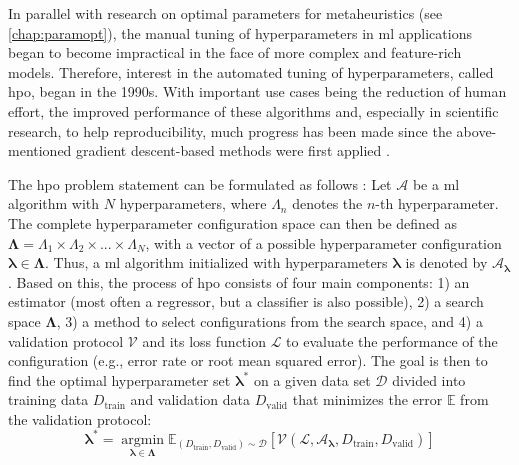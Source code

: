 In parallel with research on optimal parameters for metaheuristics (see \ref{chap:paramopt}), the manual tuning of hyperparameters in \gls{ml} applications began to become impractical in the face of more complex and feature-rich models. Therefore, interest in the automated tuning of hyperparameters, called \gls{hpo}, began in the 1990s. With important use cases being the reduction of human effort, the improved performance of these algorithms and, especially in scientific research, to help reproducibility, much progress has been made since the above-mentioned gradient descent-based methods were first applied  \cite{feurer2019hyperparameter}. 

The \gls{hpo} problem statement can be formulated as follows \cite{feurer2019hyperparameter}:
Let $\mathcal{A}$ be a \gls{ml} algorithm with $N$ hyperparameters, where $\Lambda_n$ denotes the $n$-th hyperparameter. The complete hyperparameter configuration space can then be defined as $\mathbf{\Lambda} = \Lambda_1 \times \Lambda_2 \times ... \times \Lambda_N$, with a vector of a possible hyperparameter configuration $\mathbf{\lambda} \in \mathbf{\Lambda}$. Thus, a \gls{ml} algorithm initialized with hyperparameters $\mathbf{\lambda}$ is denoted by $\mathcal{A}_\mathbf{\lambda}$.
Based on this, the process of \gls{hpo} consists of four main components: 1) an estimator (most often a regressor, but a classifier is also possible), 2) a search space $\mathbf{\Lambda}$, 3) a method to select configurations from the search space, and 4) a validation protocol $\mathcal{V}$ and its loss function $\mathcal{L}$ to evaluate the performance of the configuration (e.g., error rate or root mean squared error). 
The goal is then to find the optimal hyperparameter set $\mathbf{\lambda^*}$ on a given data set $\mathcal{D}$ divided into training data $D_\text{train}$ and validation data $D_\text{valid}$ that minimizes the error $\mathbb{E}$ from the validation protocol:
\begin{equation}
	\label{eq:hpo}
	\mathbf{\lambda^*} = \operatorname*{argmin}_{\mathbf{\lambda} \in \mathbf{\Lambda}} \mathbb{E}_{(D_\text{train}, D_\text{valid}) \sim \mathcal{D}} \left[ \mathcal{V}(\mathcal{L}, \mathcal{A}_\mathbf{\lambda}, D_\text{train}, D_\text{valid}) \right] 
\end{equation}

